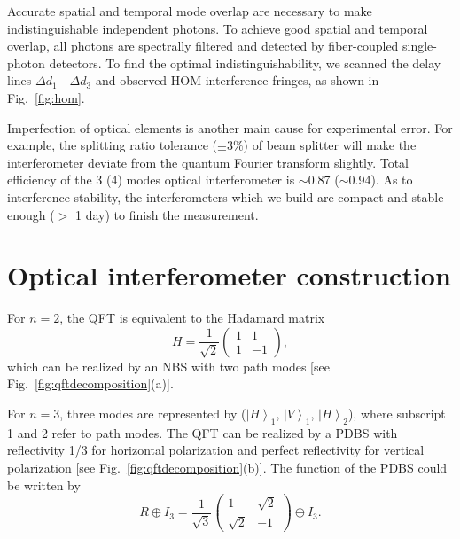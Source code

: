 \documentclass[aps,prl,twocolumn,superscriptaddress]{revtex4-1}
\begin{document}
Accurate spatial and temporal mode overlap are necessary to make indistinguishable independent photons. To achieve good spatial and temporal overlap, all photons are spectrally filtered and detected by fiber-coupled single-photon detectors. To find the optimal indistinguishability, we scanned the delay lines $\Delta {d_1}$ - $\Delta {d_3}$ and observed HOM interference fringes, as shown in Fig.~\ref{fig:hom}.

Imperfection of optical elements is another main cause for experimental error. For example, the splitting ratio tolerance ($\pm3\%$) of beam splitter will make the interferometer deviate from the quantum Fourier transform slightly. Total efficiency of the 3 (4) modes optical interferometer is $\sim$0.87 ($\sim$0.94). As to interference stability, the interferometers which we build are compact and stable enough ($>$ 1 day) to finish the measurement.


\section{Optical interferometer construction}

For $n=2$, the QFT is equivalent to the Hadamard matrix
\[H = \frac{1}{{\sqrt 2 }}\left( {\begin{array}{*{20}{c}}
	1&1\\
	1&{ - 1}
	\end{array}} \right),\]
which can be realized by an NBS with two path modes [see Fig.~\ref{fig:qftdecomposition}(a)].

For $n=3$, three modes are represented by (${\left| H \right\rangle _1}$, ${\left| V \right\rangle _1}$, ${\left| H \right\rangle _2}$), where subscript 1 and 2 refer to path modes. The QFT can be realized by a PDBS with reflectivity 1/3 for horizontal polarization and perfect reflectivity for vertical polarization [see Fig.~\ref{fig:qftdecomposition}(b)]. The function of the PDBS could be written by
\[R \oplus {I_3} = \frac{1}{{\sqrt 3 }}\left( {\begin{array}{*{20}{c}}
	1&{\sqrt 2 }\\
	{\sqrt 2 }&{ - 1}
	\end{array}} \right) \oplus {I_3}.\]
\end{document}
